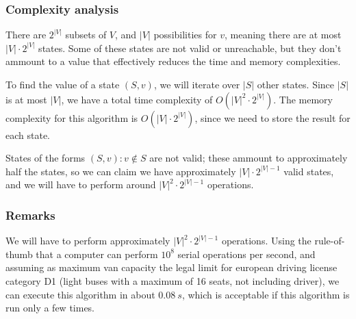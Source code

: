 \subsubsection{Complexity analysis}
There are $2^{|V|}$ subsets of $V$, and $|V|$ possibilities for $v$, meaning there are at most $|V| \cdot 2^{|V|}$ states. Some of these states are not valid or unreachable, but they don't ammount to a value that effectively reduces the time and memory complexities.\par
To find the value of a state $(S,v)$, we will iterate over $|S|$ other states. Since $|S|$ is at most $|V|$, we have a total time complexity of $O(|V|^2 \cdot 2^{|V|})$. The memory complexity for this algorithm is $O(|V| \cdot 2^{|V|})$, since we need to store the result for each state.\par
States of the forms $(S, v)\colon v \not \in S$ are not valid; these ammount to approximately half the states, so we can claim we have approximately $|V|\cdot 2^{|V|-1}$ valid states, and we will have to perform around $|V|^2\cdot 2^{|V|-1}$ operations.\par
\subsubsection{Remarks}
We will have to perform approximately $|V|^2\cdot 2^{|V|-1}$ operations. Using the rule-of-thumb that a computer can perform $10^8$ serial operations per second, and assuming as maximum van capacity the legal limit for european driving license category D1 (light buses with a maximum of 16 seats, not including driver)\cite{dir-2006-126-ec}, we can execute this algorithm in about $\SI{0.08}{s}$, which is acceptable if this algorithm is run only a few times.
